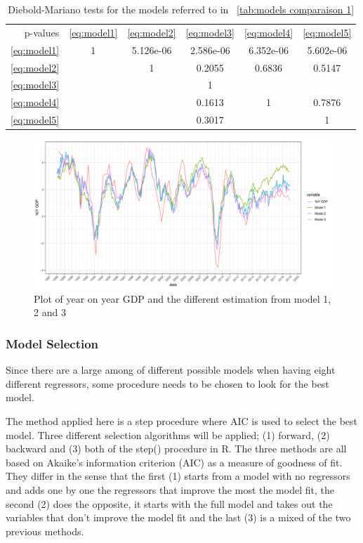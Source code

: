 \documentclass[12pt,a4paper,oneside]{book}
\begin{document}
\begin{table}[htp!]
     \centering \footnotesize
    \begin{tabular}{| r | c c c c c |}
    \cline{2-6}
 \multicolumn{0}{r|}{p-values}	& \ref{eq:model1} & \ref{eq:model2} & \ref{eq:model3} & \ref{eq:model4} & \ref{eq:model5} \\ \cline{1-6}
 \ref{eq:model1} & 1 & 5.126e-06  & 2.586e-06 & 6.352e-06 & 5.602e-06\\ 
 \ref{eq:model2} &   & 1  & 0.2055 & 0.6836 & 0.5147 \\
 \ref{eq:model3} &   &   & 1 & &   \\
 \ref{eq:model4} &   &   &  0.1613 & 1 & 0.7876 \\
 \ref{eq:model5} &   &   & 0.3017 &   & 1 \\ \cline{1-6}
\end{tabular}
    \caption{Diebold-Mariano tests for the models referred to in \ \autoref{tab:models comparaison 1}}
    \label{tab:Diebold Mariano 1}
\end{table}


\begin{figure}[!htbp]
    \centering
    \includegraphics[scale=0.5]{Graphs/predictions1.pdf}
    \caption{Plot of year on year GDP and the different estimation from model 1, 2 and 3}
    \label{fig:predictions1}
\end{figure}



\subsubsection{Model Selection}

Since there are a large among of different possible models when having eight different regressors, some procedure needs to be chosen to look for the best model.

The method applied here is a step procedure where AIC is used to select the best model.
Three different selection algorithms will be applied; (1) forward, (2) backward and  (3) both of the step() procedure in R. 
The three methods are all based on Akaike's information criterion (AIC) as a measure of goodness of fit. They differ in the sense that the first (1) starts from a model with no regressors and adds one by one the regressors that improve the most the model fit, the second (2) does the opposite, it starts with the full model and takes out the variables that don't improve the model fit and the last (3) is a mixed of the two previous methods.
\end{document}
